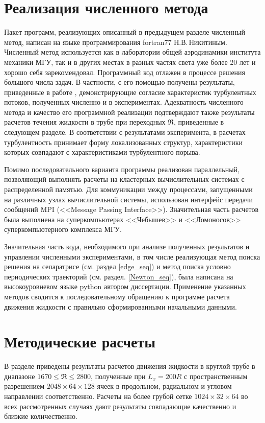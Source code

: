 \section{Реализация численного метода}

Пакет программ, реализующих описанный в предыдущем разделе численный метод, написан на языке программирования fortran77 Н.В.\,Никитиным. Численный метод используется как в лаборатории общей аэродинамики института механики МГУ, так и в других местах в разных частях света уже более 20 лет и хорошо себя зарекомендовал. Программный код отлажен в процессе решения большого числа задач. В частности, с его помощью получены результаты, приведенные в работе \cite{Nikitin2006}, демонстрирующие согласие характеристик турбулентных потоков, полученных численно и в экспериментах. Адекватность численного метода и качество его программной реализации подтверждают также результаты расчетов течения жидкости в трубе при переходных $\Re$, приведенные в следующем разделе. В соответствии с результатами эксперимента, в расчетах турбулентность принимает форму локализованных структур, характеристики которых совпадают с характеристиками турбулентного порыва.

Помимо последовательного варианта программы реализован параллельный, позволяющий выполнять расчеты на кластерных вычислительных системах с распределенной памятью. Для коммуникации между процессами, запущенными на различных узлах вычислительной системы, использован интерфейс передачи сообщений MPI (<<Message Passing Interface>>). Значительная часть расчетов была выполнена на суперкомпьютерах <<Чебышев>> и <<Ломоносов>> суперкомпьютерного комплекса МГУ. 

Значительная часть кода, необходимого при анализе полученных результатов и управлении численными экспериментами, в том числе реализующая метод поиска решения на сепаратрисе (см. раздел \ref{edge_seq}) и метод поиска условно периодических траекторий (см. раздел. \ref{Newton_seq}), была написана на высокоуровневом языке python автором диссертации. Применение указанных методов сводится к последовательному обращению к программе расчета движения жидкости с правильно сформированными начальными данными. 


\section{Методические расчеты} \label{puff_calc}

В разделе приведены результаты расчетов движения жидкости в круглой трубе в диапазоне $1670 \leqslant \Re \leqslant 2800$, полученные при $L_x=200R$ с пространственным разрешением $2048 \times 64 \times 128$ ячеек в продольном, радиальном и угловом направлении соответственно. Расчеты на более грубой сетке $1024 \times 32 \times 64$ во всех рассмотренных случаях дают результаты совпадающие качественно и близкие количественно.

